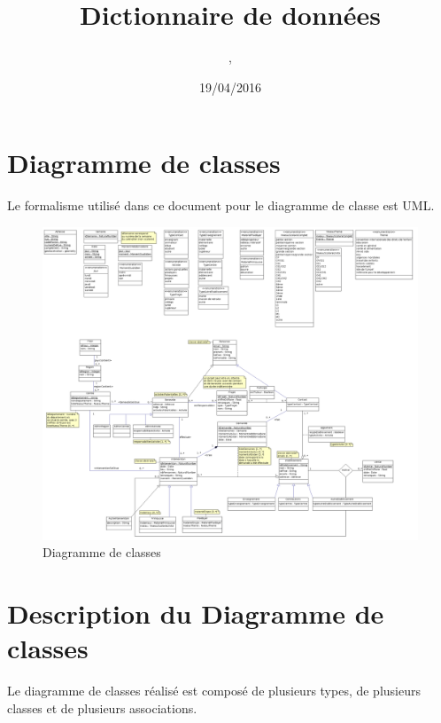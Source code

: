 \documentclass[asi, sansVersion]{picInsa}
\begin{document}
\title{Dictionnaire de données}
\author{\Mathieu, \Julie}
\date{19/04/2016} 

\maketitle

\tableofcontents

\chapter{Diagramme de classes}

Le formalisme utilisé dans ce document pour le diagramme de classe est UML.

\begin{landscape}
\begin{figure}
	\centering
	\includegraphics[scale=0.3]{images/diagrammeDeClasses}
	\caption{\label{modele}Diagramme de classes}
\end{figure}
\end{landscape}

\chapter{Description du Diagramme de classes}

Le diagramme de classes réalisé est composé de plusieurs types, de plusieurs classes et de plusieurs associations. \\ 
\end{document}
